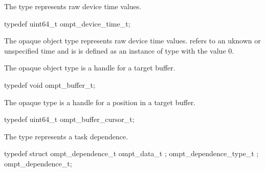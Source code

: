 \label{sec:ompt_device_time_t}

\summary
The  type represents raw device time values.

\format
\begin{ccppspecific}
\begin{omptOther}
typedef uint64_t ompt_device_time_t;
\end{omptOther}
\end{ccppspecific}

\descr
\label{sec:ompt_time_none}
The  opaque object type represents raw device time values.
 refers to an uknown or unspecified time and is is defined as 
an instance of type  with the value 0.



\label{sec:ompt_buffer_t}

\summary
The  opaque object type is a handle for a target buffer.

\format
\begin{ccppspecific}
\begin{omptOther}
typedef void ompt_buffer_t;
\end{omptOther}
\end{ccppspecific}



\label{sec:ompt_buffer_cursor_t}

\summary
The  opaque type is a handle for a position 
in a target buffer.

\format
\begin{ccppspecific}
\begin{omptOther}
typedef uint64_t ompt_buffer_cursor_t;
\end{omptOther}
\end{ccppspecific}



\label{sec:ompt_dependence_t}

\summary
The  type represents a task dependence.

\format
\begin{ccppspecific}
\begin{omptOther}
typedef struct ompt_dependence_t {
  ompt_data_t ;
  ompt_dependence_type_t ;
} ompt_dependence_t;
\end{omptOther}
\end{ccppspecific}

